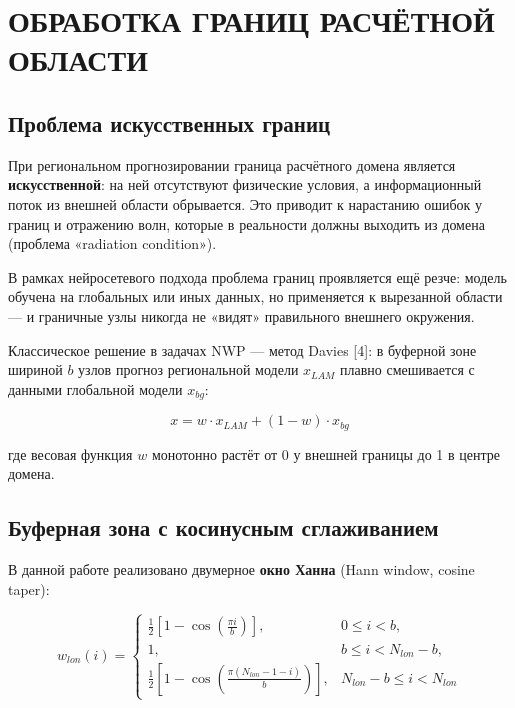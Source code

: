 \documentclass[14pt,a4paper]{extarticle}
\numberwithin{table}{section}
\numberwithin{figure}{section}
\numberwithin{equation}{section}
\begin{document}
\newpage

\section{ОБРАБОТКА ГРАНИЦ РАСЧЁТНОЙ ОБЛАСТИ}\label{ux43eux431ux440ux430ux431ux43eux442ux43aux430-ux433ux440ux430ux43dux438ux446-ux440ux430ux441ux447ux451ux442ux43dux43eux439-ux43eux431ux43bux430ux441ux442ux438}

\subsection{Проблема искусственных границ}\label{ux43fux440ux43eux431ux43bux435ux43cux430-ux438ux441ux43aux443ux441ux441ux442ux432ux435ux43dux43dux44bux445-ux433ux440ux430ux43dux438ux446}

При региональном прогнозировании граница расчётного домена является
\textbf{искусственной}: на ней отсутствуют физические условия, а
информационный поток из внешней области обрывается. Это приводит к
нарастанию ошибок у границ и отражению волн, которые в реальности должны
выходить из домена (проблема «radiation condition»).

В рамках нейросетевого подхода проблема границ проявляется ещё резче:
модель обучена на глобальных или иных данных, но применяется к
вырезанной области --- и граничные узлы никогда не «видят» правильного
внешнего окружения.

Классическое решение в задачах NWP --- метод Davies {[}4{]}: в буферной
зоне шириной \(b\) узлов прогноз региональной модели \(x_{LAM}\) плавно
смешивается с данными глобальной модели \(x_{bg}\):

\[x = w \cdot x_{LAM} + (1 - w) \cdot x_{bg}\]

где весовая функция \(w\) монотонно растёт от 0 у внешней границы до 1 в
центре домена.

\subsection{Буферная зона с косинусным сглаживанием}\label{ux431ux443ux444ux435ux440ux43dux430ux44f-ux437ux43eux43dux430-ux441-ux43aux43eux441ux438ux43dux443ux441ux43dux44bux43c-ux441ux433ux43bux430ux436ux438ux432ux430ux43dux438ux435ux43c}

В данной работе реализовано двумерное \textbf{окно Ханна} (Hann window,
cosine taper):

\[w_{lon}(i) = \begin{cases} \frac{1}{2}\left[1 - \cos\!\left(\frac{\pi i}{b}\right)\right], & 0 \le i < b, \\ 1, & b \le i < N_{lon} - b, \\ \frac{1}{2}\left[1 - \cos\!\left(\frac{\pi (N_{lon}-1-i)}{b}\right)\right], & N_{lon} - b \le i < N_{lon} \end{cases}\]
\end{document}
